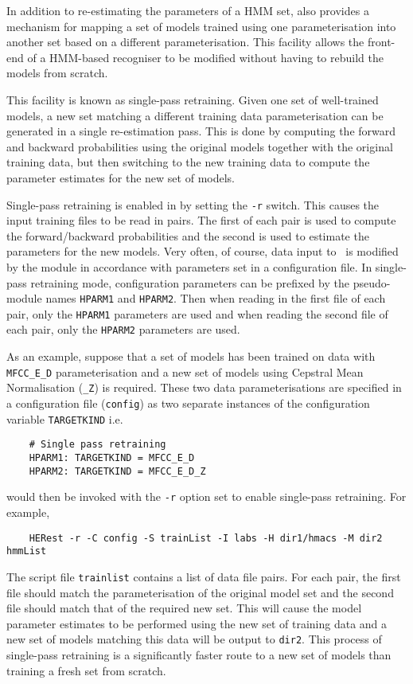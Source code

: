 
In addition to re-estimating the parameters of a HMM set, 
also provides a mechanism for mapping a set of models trained using
one parameterisation into another set based on a different parameterisation.
This facility allows the front-end of a HMM-based recogniser to be 
modified without having to rebuild the models from scratch.

This facility is known as single-pass retraining.
Given one set of well-trained models, a new set matching a
different training data parameterisation can be generated in a single
re-estimation pass. This is done by computing the forward and backward
probabilities using the original models together with the original
training data, but then switching to the new training data to compute
the parameter estimates for the new set of models.

Single-pass retraining is enabled in  by setting the
\texttt{-r} switch.  This causes the input training files to be read
in pairs.  The first of each pair is used to compute the
forward/backward probabilities and the second is used to estimate the
parameters for the new models.  Very often, of course, data input to
\HTK\ is modified by the  module in accordance with
parameters set in a configuration file.  In single-pass retraining mode,
configuration parameters can be prefixed by the pseudo-module names
\texttt{HPARM1} and \texttt{HPARM2}.  Then when reading in the first
file of each pair, only the \texttt{HPARM1} parameters are used and
when reading the second file of each pair, only the \texttt{HPARM2}
parameters are used.

As an example, suppose that a set of models has been trained on data
with \texttt{MFCC\_E\_D} parameterisation and a new set of models using
Cepstral Mean Normalisation (\texttt{\_Z}) is required. These two data
parameterisations are specified in a configuration file
(\texttt{config}) as two separate instances of the configuration
variable \texttt{TARGETKIND} i.e.
\begin{verbatim}
    # Single pass retraining
    HPARM1: TARGETKIND = MFCC_E_D
    HPARM2: TARGETKIND = MFCC_E_D_Z
\end{verbatim}
 would then be invoked with the \texttt{-r} option set to enable 
single-pass retraining. For example,
\begin{verbatim}
    HERest -r -C config -S trainList -I labs -H dir1/hmacs -M dir2 hmmList
\end{verbatim}
The script file  \texttt{trainlist} contains a list of data file
pairs. For each pair, the first file should match the parameterisation of 
the original model set and the second file should match that of the
required new set.
This will cause the model parameter estimates to be performed using the 
new set of training data and a new set of models matching this data will  
be output to \texttt{dir2}. This process of single-pass retraining is
a significantly faster route to a new set of models than training a fresh 
set from scratch.

